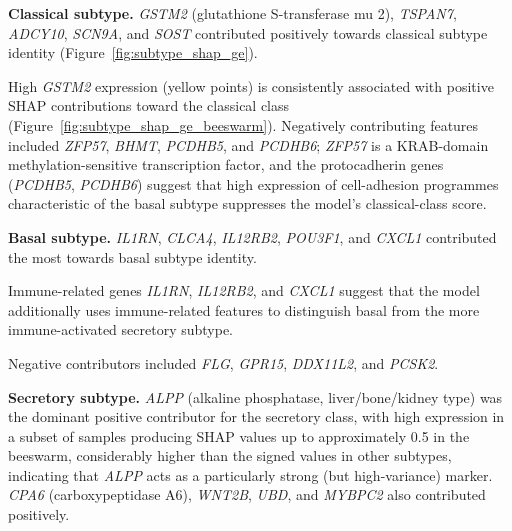 \textbf{Classical subtype.} \textit{GSTM2} (glutathione S-transferase mu 2), \textit{TSPAN7}, \textit{ADCY10}, \textit{SCN9A}, and \textit{SOST} contributed positively towards classical subtype identity (Figure~\ref{fig:subtype_shap_ge}). 


High \textit{GSTM2} expression (yellow points) is consistently associated with positive SHAP contributions toward the classical class (Figure~\ref{fig:subtype_shap_ge_beeswarm}). Negatively contributing features included \textit{ZFP57}, \textit{BHMT}, \textit{PCDHB5}, and \textit{PCDHB6}; \textit{ZFP57} is a KRAB-domain methylation-sensitive transcription factor, and the protocadherin genes (\textit{PCDHB5}, \textit{PCDHB6}) suggest that high expression of cell-adhesion programmes characteristic of the basal subtype suppresses the model's classical-class score.

\textbf{Basal subtype.} \textit{IL1RN}, \textit{CLCA4}, \textit{IL12RB2}, \textit{POU3F1}, and \textit{CXCL1} contributed the most towards basal subtype identity. 



Immune-related genes \textit{IL1RN}, \textit{IL12RB2}, and \textit{CXCL1} suggest that the model additionally uses immune-related features to distinguish basal from the more immune-activated secretory subtype. 


Negative contributors included \textit{FLG}, \textit{GPR15}, \textit{DDX11L2}, and \textit{PCSK2}.


\textbf{Secretory subtype.} \textit{ALPP} (alkaline phosphatase, liver/bone/kidney type) was the dominant positive contributor for the secretory class, with high expression in a subset of samples producing SHAP values up to approximately 0.5 in the beeswarm, considerably higher than the signed values in other subtypes, indicating that \textit{ALPP} acts as a particularly strong (but high-variance) marker. \textit{CPA6} (carboxypeptidase A6), \textit{WNT2B}, \textit{UBD}, and \textit{MYBPC2} also contributed positively. 

